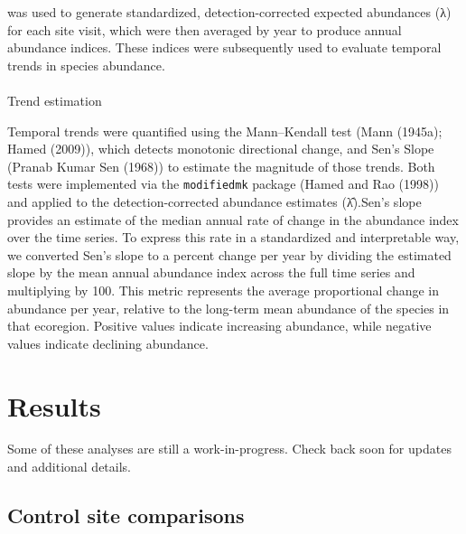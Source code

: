 \documentclass[
  letterpaper,
  DIV=11,
  numbers=noendperiod]{scrartcl}
\makeatletter
\let\oldparagraph\paragraph
\renewcommand{\paragraph}{
    \@ifstar
      \xxxParagraphStar
      \xxxParagraphNoStar
  }
\newcommand{\xxxParagraphStar}[1]{\oldparagraph*{#1}\mbox{}}
\newcommand{\xxxParagraphNoStar}[1]{\oldparagraph{#1}\mbox{}}
\makeatother
\begin{document}
was used to generate standardized, detection-corrected expected
abundances (λ) for each site visit, which were then averaged by year to
produce annual abundance indices. These indices were subsequently used
to evaluate temporal trends in species abundance.

\paragraph{Trend estimation}\label{trend-estimation}

Temporal trends were quantified using the Mann--Kendall test (Mann
(1945a); Hamed (2009)), which detects monotonic directional change, and
Sen's Slope (Pranab Kumar Sen (1968)) to estimate the magnitude of those
trends. Both tests were implemented via the \texttt{modifiedmk} package
(Hamed and Rao (1998)) and applied to the detection-corrected abundance
estimates (λ̂).Sen's slope provides an estimate of the median annual rate
of change in the abundance index over the time series. To express this
rate in a standardized and interpretable way, we converted Sen's slope
to a percent change per year by dividing the estimated slope by the mean
annual abundance index across the full time series and multiplying by
100. This metric represents the average proportional change in abundance
per year, relative to the long-term mean abundance of the species in
that ecoregion. Positive values indicate increasing abundance, while
negative values indicate declining abundance.

\section{Results}\label{results}

\begin{tcolorbox}[enhanced jigsaw, toptitle=1mm, title=\textcolor{quarto-callout-note-color}{\faInfo}\hspace{0.5em}{Note}, colback=white, colbacktitle=quarto-callout-note-color!10!white, opacitybacktitle=0.6, breakable, rightrule=.15mm, coltitle=black, toprule=.15mm, titlerule=0mm, left=2mm, bottomtitle=1mm, bottomrule=.15mm, arc=.35mm, leftrule=.75mm, opacityback=0, colframe=quarto-callout-note-color-frame]

Some of these analyses are still a work-in-progress. Check back soon for
updates and additional details.

\end{tcolorbox}

\subsection{Control site comparisons}\label{control-site-comparisons-1}
\end{document}
